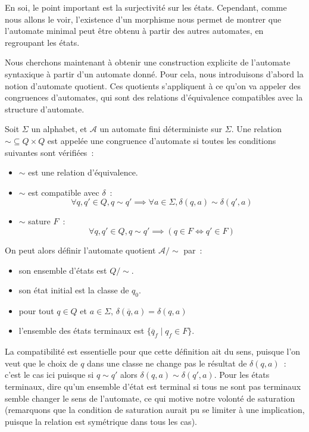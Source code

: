 \begin{remark}
  En soi, le point important est la surjectivité sur les états. Cependant, comme
  nous allons le voir, l'existence d'un morphisme nous permet de montrer que
  l'automate minimal peut être obtenu à partir des autres automates, en
  regroupant les états.
\end{remark}

Nous cherchons maintenant à obtenir une construction explicite de l'automate
syntaxique à partir d'un automate donné. Pour cela, nous introduisons d'abord la
notion d'automate quotient. Ces quotients s'appliquent à ce qu'on va appeler des
congruences d'automates, qui sont des relations d'équivalence compatibles avec
la structure d'automate.

\begin{definition}
  Soit $\Sigma$ un alphabet, et $\mathcal A$ un automate fini déterministe sur
  $\Sigma$. Une relation $\sim \subseteq Q \times Q$ est appelée une congruence
  d'automate si toutes les conditions suivantes sont vérifiées~:
  \begin{itemize}
  \item $\sim$ est une relation d'équivalence.
  \item $\sim$ est compatible avec $\delta$~:
    \[\forall q,q' \in Q, q \sim q' \implies \forall a \in \Sigma,
    \delta(q,a) \sim \delta(q',a)\]
  \item $\sim$ sature $F$~:
    \[\forall q,q' \in Q, q \sim q' \implies (q \in F \iff q' \in F)\]
  \end{itemize}

  On peut alors définir l'automate quotient $\mathcal A/\sim$ par~:
  \begin{itemize}
  \item son ensemble d'états est $Q/\sim$.
  \item son état initial est la classe de $q_0$.
  \item pour tout $q \in Q$ et $a \in \Sigma$,
    $\delta(\overline q,a) =\delta(q,a)$
  \item l'ensemble des états terminaux est $\{\overline q_f \mid q_f \in F\}$.
  \end{itemize}
\end{definition}

\begin{remark}
  La compatibilité est essentielle pour que cette définition ait du sens,
  puisque l'on veut que le choix de $q$ dans une classe ne change pas le
  résultat de $\delta(q,a)$~: c'est le cas ici puisque si $q\sim q'$ alors
  $\delta(q,a) \sim \delta(q',a)$. Pour les états terminaux, dire qu'un ensemble
  d'état est terminal si tous ne sont pas terminaux semble changer le sens de
  l'automate, ce qui motive notre volonté de saturation (remarquons que la
  condition de saturation aurait pu se limiter à une implication, puisque la
  relation est symétrique dans tous les cas).
\end{remark}

